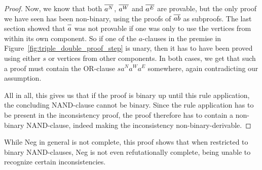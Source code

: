 \begin{proof}
Now, we know that both $\ol{a^N}$, $\ol{a^W}$ and $\ol{a^E}$ are provable, but the only proof we have seen has been non-binary, using the proofs of $\ol{ab}$ as subproofs.
The last section showed that $\ol{a}$ was not provable if one was only to use the vertices from within its own component.
So if one of the $a$-clauses in the premise in Figure~\ref{fig:triple_double_proof_step} is unary, then it has to have been proved using either $s$ or vertices from other components.
In both cases, we get that such a proof must contain the OR-clause $sa^Na^Wa^E$ somewhere, again contradicting our assumption.

All in all, this gives us that if the proof is binary up until this rule application, the concluding NAND-clause cannot be binary.
Since the rule application has to be present in the inconsistency proof, the proof therefore has to contain a non-binary NAND-clause, indeed making the inconsistency non-binary-derivable.
\end{proof}

While Neg in general is not complete, this proof shows that when restricted to binary NAND-clauses, Neg is not even refutationally complete, being unable to recognize certain inconsistencies.

